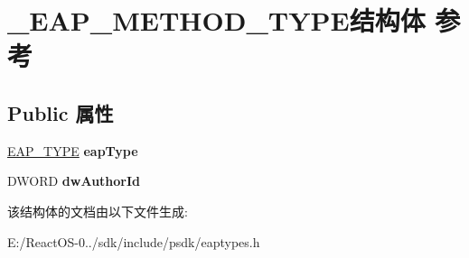 \hypertarget{struct___e_a_p___m_e_t_h_o_d___t_y_p_e}{}\section{\+\_\+\+E\+A\+P\+\_\+\+M\+E\+T\+H\+O\+D\+\_\+\+T\+Y\+P\+E结构体 参考}
\label{struct___e_a_p___m_e_t_h_o_d___t_y_p_e}
\subsection*{Public 属性}
\begin{DoxyCompactItemize}
\item 
\mbox{\label{struct___e_a_p___m_e_t_h_o_d___t_y_p_e_a9d7997db5ee3ba5728acf05e16b2b41d}} 
\hyperlink{struct___e_a_p___t_y_p_e}{E\+A\+P\+\_\+\+T\+Y\+PE} {\bfseries eap\+Type}
\item 
\mbox{\label{struct___e_a_p___m_e_t_h_o_d___t_y_p_e_aef7dfc25e5b00def103da94e1c66249a}} 
D\+W\+O\+RD {\bfseries dw\+Author\+Id}
\end{DoxyCompactItemize}


该结构体的文档由以下文件生成\+:\begin{DoxyCompactItemize}
\item 
E\+:/\+React\+O\+S-\/0../sdk/include/psdk/eaptypes.\+h\end{DoxyCompactItemize}
